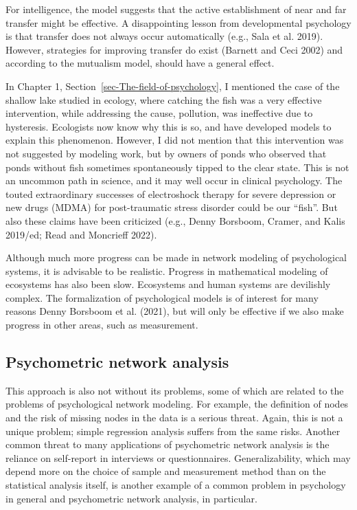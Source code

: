 \documentclass[
  a4paper,
  DIV=11,
  numbers=noendperiod]{scrreprt}
\begin{document}
For intelligence, the model suggests that the active establishment of
near and far transfer might be effective. A disappointing lesson from
developmental psychology is that transfer does not always occur
automatically (e.g., Sala et al. 2019). However, strategies for
improving transfer do exist (Barnett and Ceci 2002) and according to the
mutualism model, should have a general effect.

In Chapter 1, Section~\ref{sec-The-field-of-psychology}, I mentioned the
case of the shallow lake studied in ecology, where catching the fish was
a very effective intervention, while addressing the cause, pollution,
was ineffective due to hysteresis. Ecologists now know why this is so,
and have developed models to explain this phenomenon. However, I did not
mention that this intervention was not suggested by modeling work, but
by owners of ponds who observed that ponds without fish sometimes
spontaneously tipped to the clear state. This is not an uncommon path in
science, and it may well occur in clinical psychology. The touted
extraordinary successes of electroshock therapy for severe depression or
new drugs (MDMA) for post-traumatic stress disorder could be our
``fish''. But also these claims have been criticized (e.g., Denny
Borsboom, Cramer, and Kalis 2019/ed; Read and Moncrieff 2022).

Although much more progress can be made in network modeling of
psychological systems, it is advisable to be realistic. Progress in
mathematical modeling of ecosystems has also been slow. Ecosystems and
human systems are devilishly complex. The formalization of psychological
models is of interest for many reasons Denny Borsboom et al. (2021), but
will only be effective if we also make progress in other areas, such as
measurement.

\hypertarget{sec-Psychometric-network-analysis}{%
\subsection{Psychometric network
analysis}\label{sec-Psychometric-network-analysis}}

This approach is also not without its problems, some of which are
related to the problems of psychological network modeling. For example,
the definition of nodes and the risk of missing nodes in the data is a
serious threat. Again, this is not a unique problem; simple regression
analysis suffers from the same risks. Another common threat to many
applications of psychometric network analysis is the reliance on
self-report in interviews or questionnaires. Generalizability, which may
depend more on the choice of sample and measurement method than on the
statistical analysis itself, is another example of a common problem in
psychology in general and psychometric network analysis, in particular.
\end{document}
